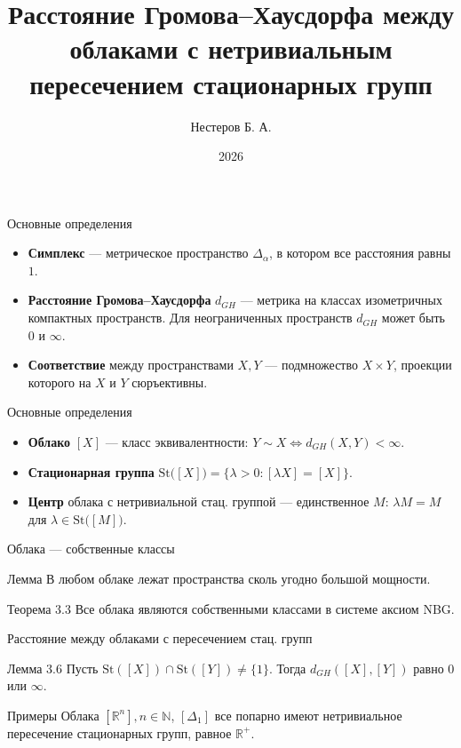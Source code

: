 \documentclass[12pt]{beamer}
\title[Расстояние Г-Х между облаками...]{Расстояние Громова--Хаусдорфа
  между облаками с нетривиальным
пересечением стационарных групп}
\author{Нестеров Б. А.}
\institute{607 группа}
\date{2026}
\begin{document}
\frame{\titlepage}

\begin{frame}{Основные определения}
  \begin{itemize}
    \item \textbf{Симплекс} --- метрическое пространство \( \Delta _ \alpha
      \), в котором все расстояния равны \( 1 \).
    \item \textbf{Расстояние Громова–Хаусдорфа} $d_{GH}$ --- метрика на
      классах изометричных компактных пространств. Для неограниченных
      пространств $d_{GH}$ может быть \( 0 \) и $\infty$.
    \item \textbf{Соответствие} между пространствами \( X, Y \) ---
      подмножество \( X \times Y \), проекции которого на \( X \) и
      \( Y \) сюръективны.
  \end{itemize}
\end{frame}
\begin{frame}{Основные определения}
  \begin{itemize}
    \item \textbf{Облако} $[X]$ --- класс эквивалентности: $Y\sim X \iff
      d_{GH}(X,Y)<\infty$.
    \item \textbf{Стационарная группа} $\mathrm{St}\big([X]\big) =
      \bigl\{\lambda>0
      : [\lambda X]=[X]\bigr\}$.
    \item \textbf{Центр} облака с нетривиальной стац. группой --- единственное
      $M$: $\lambda M = M$ для $\lambda\in\mathrm{St}\big([M]\big)$.
  \end{itemize}
\end{frame}

\begin{frame}{Облака --- собственные классы}
  \begin{block}{Лемма}
    В любом облаке лежат пространства сколь угодно большой мощности.
  \end{block}
  \pause
  \begin{block}{Теорема 3.3}
    Все облака являются собственными классами в системе аксиом NBG.
  \end{block}
\end{frame}

\begin{frame}{Расстояние между облаками с пересечением стац. групп}
  \begin{block}{Лемма 3.6}
    Пусть $\mathrm{St}([X])\cap\mathrm{St}([Y])\neq\{1\}$. Тогда
    $d_{GH}([X],[Y])$ равно $0$ или $\infty$.
  \end{block}
  \pause
  \begin{block}{Примеры}
    Облака \( [\mathbb{R}^n], n \in \mathbb{N} \), \( [\Delta _1] \)
    все попарно имеют
    нетривиальное пересечение стационарных групп, равное \( \mathbb{R}^+ \).
  \end{block}
\end{frame}
\end{document}
